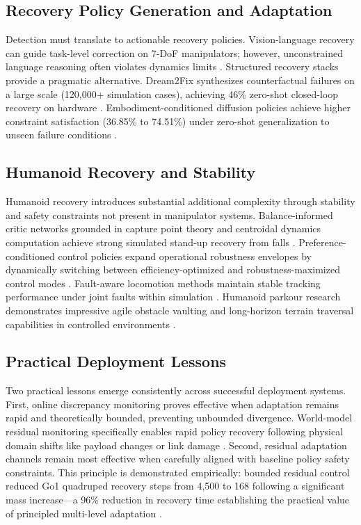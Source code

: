 \documentclass[12pt,a4paper,oneside]{report}
\begin{document}
\subsection{Recovery Policy Generation and Adaptation}
Detection must translate to actionable recovery policies. Vision-language recovery can guide task-level correction on 7-DoF manipulators; however, unconstrained language reasoning often violates dynamics limits \cite{chen2024vlm}. Structured recovery stacks provide a pragmatic alternative. Dream2Fix synthesizes counterfactual failures on a large scale (120,000+ simulation cases), achieving 46\% zero-shot closed-loop recovery on hardware \cite{li2025dream2fix}. Embodiment-conditioned diffusion policies achieve higher constraint satisfaction (36.85\% to 74.51\%) under zero-shot generalization to unseen failure conditions \cite{briscoe2025deft}.

\subsection{Humanoid Recovery and Stability}
Humanoid recovery introduces substantial additional complexity through stability and safety constraints not present in manipulator systems. Balance-informed critic networks grounded in capture point theory and centroidal dynamics computation achieve strong simulated stand-up recovery from falls \cite{poddar2026embedding}. Preference-conditioned control policies expand operational robustness envelopes by dynamically switching between efficiency-optimized and robustness-maximized control modes \cite{li2026pchc}. Fault-aware locomotion methods maintain stable tracking performance under joint faults within simulation \cite{lee2026tolebi}. Humanoid parkour research demonstrates impressive agile obstacle vaulting and long-horizon terrain traversal capabilities in controlled environments \cite{wu2026parkour}.

\subsection{Practical Deployment Lessons}
Two practical lessons emerge consistently across successful deployment systems. First, online discrepancy monitoring proves effective when adaptation remains rapid and theoretically bounded, preventing unbounded divergence. World-model residual monitoring specifically enables rapid policy recovery following physical domain shifts like payload changes or link damage \cite{domberg2026selfadapting}. Second, residual adaptation channels remain most effective when carefully aligned with baseline policy safety constraints. This principle is demonstrated empirically: bounded residual control reduced Go1 quadruped recovery steps from 4,500 to 168 following a significant mass increase---a 96\% reduction in recovery time establishing the practical value of principled multi-level adaptation \cite{jayasinghe2026residual}.
\end{document}
